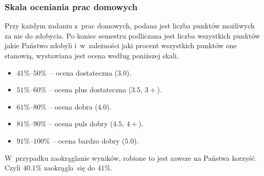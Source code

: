 \documentclass[10pt,t]{beamer}
\begin{document}
\begin{frame}
  \frametitle{Skala oceniania prac domowych}


  Przy każdym zadaniu z~prac domowych, podana jest liczba punktów możliwych
  za nie do zdobycia. Po koniec semestru podliczana jest liczba wszystkich
  punktów jakie Państwo zdobyli i~w~zależności jaki procent wszystkich
  punktów one stanowią, wystawiana jest ocena według poniższej skali.

  \vspace{-0.3em}



  \begin{itemize}

  \item $41\%\text{--}50\%$~-- ocena dostateczna ($3.0$).

  \item $51\%\text{--}60\%$ -- ocena plus dostateczna ($3.5$, $3+$).

  \item $61\%\text{--}80\%$ -- ocena dobra ($4.0$).

  \item $81\%\text{--}90\%$ -- ocena puls dobry ($4.5$, $4+$).

  \item $91\%\text{--}100\%$ -- ocena bardzo dobry ($5.0$).

  \end{itemize}

  \vspace{-0.3em}



  W~przypadku zaokrąglanie wyników, robione to jest zawsze na Państwa
  korzyść. Czyli $40.1\%$ zaokrągla~się do $41\%$.

\end{frame}
\end{document}
